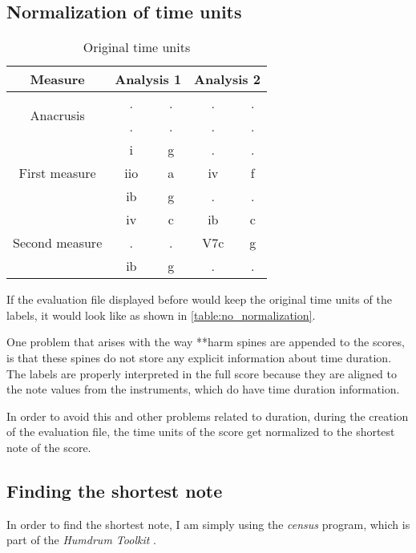   \subsection{Normalization of time units}

	\begin{table}[tbp]
	\centering
	\begin{tabular}{|c|c|c|c|c|}
	\hline
	Measure & \multicolumn{2}{c|}{Analysis 1} & \multicolumn{2}{c|}{Analysis 2} \\ \hline
	\multirow{2}{*}{Anacrusis} & . & . & . & . \\ \cline{2-5}
	 & . & . & . & . \\ \hline
	\multirow{3}{*}{First measure} & i & g & . & . \\ \cline{2-5}
	 & iio & a & iv & f \\ \cline{2-5}
	 & ib & g & . & . \\ \hline
	\multirow{3}{*}{Second measure} & iv & c & ib & c \\ \cline{2-5}
	 & . & . & V7c & g \\ \cline{2-5}
	 & ib & g & . & . \\ \hline
	\end{tabular}
	\caption{Original time units}
	\label{table:no_normalization}
	\end{table}

	If the evaluation file displayed before would keep the original time units of the labels, it would look like as shown in \autoref{table:no_normalization}.

	One problem that arises with the way **harm spines are appended to the scores, is that these spines do not store any explicit information about time duration. The labels are properly interpreted in the full score because they are aligned to the note values from the instruments, which do have time duration information.

	In order to avoid this and other problems related to duration, during the creation of the evaluation file, the time units of the score get normalized to the shortest note of the score.

	\subsection{Finding the shortest note}
		In order to find the shortest note, I am simply using the \emph{census} program, which is part of the \emph{Humdrum Toolkit} \cite{humdrum}.

